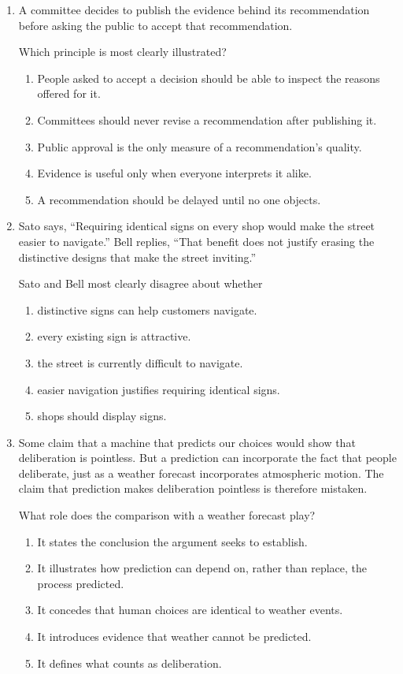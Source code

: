 \begin{enumerate}
\item A committee decides to publish the evidence behind its recommendation before asking the public to accept that recommendation.

Which principle is most clearly illustrated?
\begin{enumerate}
\item[(A)] People asked to accept a decision should be able to inspect the reasons offered for it.
\item[(B)] Committees should never revise a recommendation after publishing it.
\item[(C)] Public approval is the only measure of a recommendation's quality.
\item[(D)] Evidence is useful only when everyone interprets it alike.
\item[(E)] A recommendation should be delayed until no one objects.
\end{enumerate}

\item Sato says, ``Requiring identical signs on every shop would make the street easier to navigate.'' Bell replies, ``That benefit does not justify erasing the distinctive designs that make the street inviting.''

Sato and Bell most clearly disagree about whether
\begin{enumerate}
\item[(A)] distinctive signs can help customers navigate.
\item[(B)] every existing sign is attractive.
\item[(C)] the street is currently difficult to navigate.
\item[(D)] easier navigation justifies requiring identical signs.
\item[(E)] shops should display signs.
\end{enumerate}

\item Some claim that a machine that predicts our choices would show that deliberation is pointless. But a prediction can incorporate the fact that people deliberate, just as a weather forecast incorporates atmospheric motion. The claim that prediction makes deliberation pointless is therefore mistaken.

What role does the comparison with a weather forecast play?
\begin{enumerate}
\item[(A)] It states the conclusion the argument seeks to establish.
\item[(B)] It illustrates how prediction can depend on, rather than replace, the process predicted.
\item[(C)] It concedes that human choices are identical to weather events.
\item[(D)] It introduces evidence that weather cannot be predicted.
\item[(E)] It defines what counts as deliberation.
\end{enumerate}


\end{enumerate}
